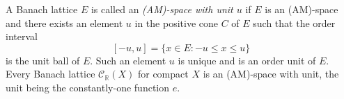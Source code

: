 A Banach lattice $E$ is called an \emph{(AM)-space with unit $u$} if $E$ is an (AM)-space and there exists an element $u$ in the positive cone $C$ of $E$ such that the order interval
$$
[-u, u] = \{x \in E : -u \leq x \leq u\}
$$
is the unit ball of $E$. Such an element $u$ is unique and is an order unit of $E$. Every Banach lattice $\mathcal{C}_{\mathbb{R}}(X)$ for compact $X$ is an (AM)-space with unit, the unit being the constantly-one function $e$.
